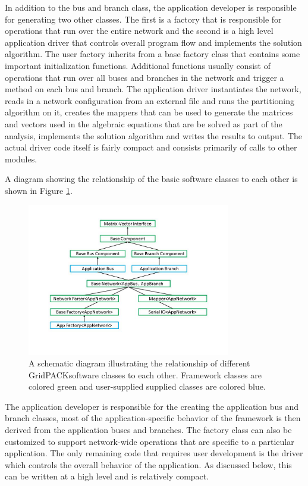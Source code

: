 \documentclass[preprint]{acm_proc_article-sp}
\begin{document}
In addition to the bus and branch class, the application developer is
responsible for generating two other classes. The first is a factory that
is responsible for operations that run over the entire network
and the second is a high
level application driver that controls overall program flow and implements the
solution algorithm. The user factory inherits from a base factory class that
contains some important initialization functions. Additional functions usually
consist of operations that run over all buses and branches in the network and
trigger a method on each bus and branch. The application driver instantiates the
network, reads in a network configuration from an external file and runs the
partitioning algorithm on it, creates the mappers that can be used to generate
the matrices and vectors used in the algebraic equations that are be solved as
part of the analysis, implements the solution algorithm and writes the results
to output. The actual driver code itself is fairly compact and consists
primarily of calls to other modules.

A diagram showing the relationship of the basic software classes to each other
is shown in Figure \ref{templates}.
\begin{figure}
\centering
\includegraphics[width=3.5in,keepaspectratio=true]{./FigT}
\caption{\label{templates} A schematic diagram illustrating the relationship of
different GridPACK\texttrademark software classes to each other.
Framework classes are colored green and user-supplied supplied classes are
colored blue. }
\end{figure}
The application developer is responsible for the creating the application bus
and branch classes, most of the application-specific behavior of the framework
is then derived from the application buses and branches. The factory
class can also be customized to support network-wide operations that are
specific to a particular application. The only remaining code that requires
user development is the driver which controls the overall behavior
of the application. As discussed below, this can be written at a high
level and is relatively compact.
\end{document}

